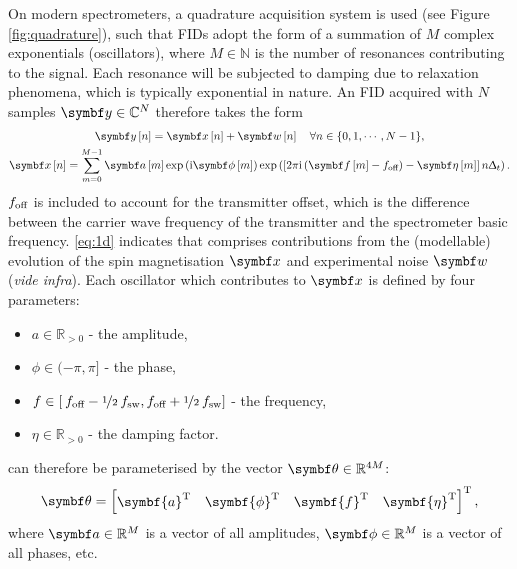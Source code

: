 On modern spectrometers, a quadrature acquisition system is used\cite[Appendix
A.5]{Levitt2007} (see Figure \ref{fig:quadrature}), such that \acp{FID} adopt
the form of a summation of $M$ complex exponentials (oscillators), where $M \in
\mathbb{N}$ is the number of resonances contributing to the signal. Each
resonance will be subjected to damping due to relaxation phenomena, which is
typically exponential in nature.  An \ac{FID} acquired with $N$ samples $\by
\in \mathbb{C}^{N}$ therefore takes the form
\begin{subequations}
    \begin{gather}
        \by \left[n\right] =
            \bx \left[ n \right] +
            \bw \left[ n \right]
            \quad \forall n \in \lbrace 0, 1, \cdots, N - 1 \rbrace,
            \label{eq:y=x+w} \\
        \bx \left[n\right] =
            \sum_{m=0}^{M-1} \bdam \exp\left(
                \iu \bdphim
            \right) \exp\left(
                \left[ 2 \pi \iu \left(\bdfm - \foff\right)- \bdetam \right] n \Dt
            \right).
            \label{eq:x}
    \end{gather}
    \label{eq:1d}%
\end{subequations}%
$f_{\text{off}}$ is included to account for the transmitter offset, which is the
difference between the carrier wave frequency of the transmitter and the
spectrometer basic frequency. \eqref{eq:1d} indicates that  comprises
contributions from the (modellable) evolution of the spin magnetisation $\bx$
and experimental noise $\bw$ (\emph{vide infra}). Each oscillator which
contributes to $\bx$ is defined by four parameters:
\begin{itemize}
    \item $a \in \mathbb{R}_{>0}$ - the amplitude,
    \item $\phi \in (-\pi, \pi]$ - the phase,
    \item $f \in \left[\hspace*{2pt}f_{\text{off}} - \nicefrac{1}{2} \hspace*{2pt}
        f_{\mathrm{sw}}, f_{\text{off}} + \nicefrac{1}{2} \hspace*{2pt}f_{\mathrm{sw}} \right]$ - the frequency,
    \item $\eta \in \mathbb{R}_{>0}$ - the damping factor.
\end{itemize}%
 can therefore be parameterised by the vector $\bth \in
\mathbb{R}^{4M}$:
\begin{equation}
    \bth =
    \begin{bmatrix}
        \symbf{a}\T & \symbf{\phi}\T & \symbf{f}\T & \symbf{\eta}\T
    \end{bmatrix}\T,
\end{equation}
where $\bda \in \mathbb{R}^M$ is a vector of all amplitudes, $\bdphi \in
\mathbb{R}^M$ is a vector of all phases, etc.

